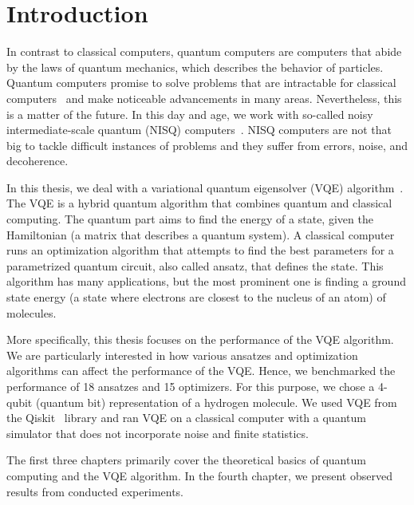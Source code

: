 \chapter*{Introduction}

In contrast to classical computers, quantum computers are computers that abide by the laws of quantum mechanics, which describes the behavior of particles. Quantum computers promise to solve problems that are intractable for classical computers~\cite{peruzzo} and make noticeable advancements in many areas. Nevertheless, this is a matter of the future. In this day and age, we work with so-called noisy intermediate-scale quantum (NISQ) computers~\cite{nisq}. NISQ computers are not that big to tackle difficult instances of problems and they suffer from errors, noise, and decoherence.

In this thesis, we deal with a variational quantum eigensolver (VQE) algorithm~\cite{peruzzo,vqe_method}. The VQE is a hybrid quantum algorithm that combines quantum and classical computing. The quantum part aims to find the energy of a state, given the Hamiltonian (a matrix that describes a quantum system). A classical computer runs an optimization algorithm that attempts to find the best parameters for a parametrized quantum circuit, also called ansatz, that defines the state. This algorithm has many applications, but the most prominent one is finding a ground state energy (a state where electrons are closest to the nucleus of an atom) of molecules.

More specifically, this thesis focuses on the performance of the VQE algorithm. We are particularly interested in how various ansatzes and optimization algorithms can affect the performance of the VQE. Hence, we benchmarked the performance of 18 ansatzes and 15 optimizers. For this purpose, we chose a 4-qubit (quantum bit) representation of a hydrogen molecule. We used VQE from the Qiskit~\cite{qiskit} library and ran VQE on a classical computer with a quantum simulator that does not incorporate noise and finite statistics.

The first three chapters primarily cover the theoretical basics of quantum computing and the VQE algorithm. In the fourth chapter, we present observed results from conducted experiments.
